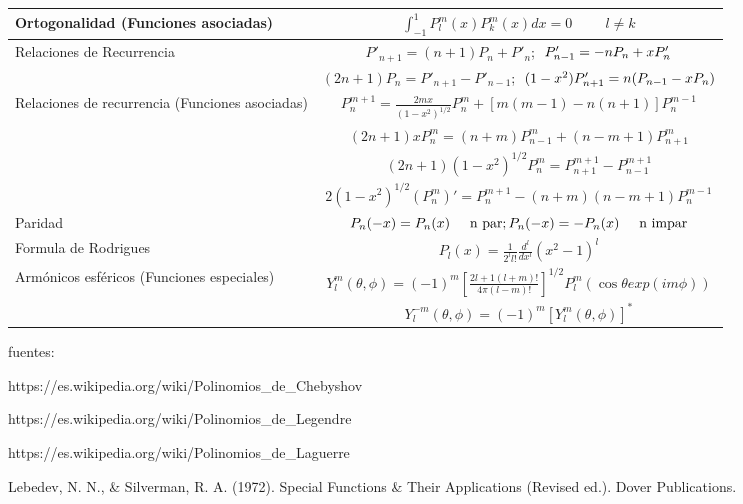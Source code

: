 \documentclass[12pt,a4paper]{article}
\begin{document}
\begin{table}[t]
\begin{center}
\begin{tabular}{ | m{3.5cm} |  c |}
            Ortogonalidad (Funciones asociadas) & $\int_{-1}^{1} P_{\textit{l}}^{m}(x)P_{k}^{m}(x)dx=0 \hspace{1cm} \textit{l}\neq k$ \\ \hline
            Relaciones de Recurrencia & $P'_{n+1}=(n+1)P_n+P'_n$; $\hspace{0.1cm} P'_{n-1}=-nP_n+xP'_n$ \\ 
             & $(2n+1)P_n=P'_{n+1}-P'_{n-1}$; $\hspace{0.1cm} (1-x^2)P'_{n+1}=n(P_{n-1}-xP_n)$ \\ \hline
            Relaciones de recurrencia (Funciones asociadas) & $P_{n}^{m+1}=\frac{2mx}{(1-x^2)^{1/2}}P_{n}^{m}+[m(m-1)-n(n+1)]P_{n}^{m-1}$ \\ 
             & $(2n+1)xP_{n}^{m}=(n+m)P_{n-1}^{m}+(n-m+1)P_{n+1}^{m}$ \\
              & $(2n+1)(1-x^2)^{1/2}P_{n}^{m}=P_{n+1}^{m+1}-P_{n-1}^{m+1}$ \\ 
              & $2(1-x^2)^{1/2}(P_{n}^{m})'=P_{n}^{m+1}-(n+m)(n-m+1)P_{n}^{m-1}$ \\ \hline
            Paridad  & $P_n(-x)=P_n(x) \hspace{0.5cm} \text{n par}; P_n(-x)=-P_n(x) \hspace{0.5cm} \text{n impar}$ \\ \hline
            Formula de Rodrigues & $P_\textit{l}(x)= \frac{1}{2^{\textit{l}}\textit{l}!} \frac{d^{\textit{l}}}{dx^{\textit{l}}}(x^2-1)^{\textit{l}}$ \\ \hline
            Armónicos esféricos (Funciones especiales) & $Y_{\textit{l}}^{m}(\theta,\phi)=(-1)^m \left[\frac{2\textit{l}+1(\textit{l}+m)!}{4\pi(\textit{l}-m)!}\right]^{1/2}P_{\textit{l}}^{m}(\cos{\theta}exp(im \phi))$ \\ 
             & $Y_{\textit{l}}^{-m}(\theta,\phi)=(-1)^{m}[Y_\textit{l}^{m}(\theta,\phi)]^*$ \\ \hline
        \end{tabular}
        \end{center}
\end{table}

\newpage

fuentes:

 https://es.wikipedia.org/wiki/Polinomios\_de\_Chebyshov
 
 https://es.wikipedia.org/wiki/Polinomios\_de\_Legendre
 
 https://es.wikipedia.org/wiki/Polinomios\_de\_Laguerre
 
 Lebedev, N. N., & Silverman, R. A. (1972). Special Functions & Their Applications (Revised ed.). Dover Publications.
\end{document}
